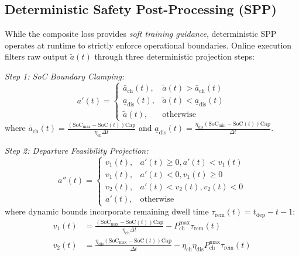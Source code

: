 \documentclass[journal]{IEEEtran}
\theoremstyle{remark}
\begin{document}
\subsection{Deterministic Safety Post-Processing (SPP)}
While the composite loss provides \textit{soft training guidance}, deterministic SPP operates at runtime to strictly enforce operational boundaries. Online execution filters raw output $\tilde{a}(t)$ through three deterministic projection steps:

\textit{Step 1: SoC Boundary Clamping:}
\begin{equation}
a'(t) = \begin{cases}
\bar{a}_{\mathrm{ch}}(t), & \tilde{a}(t) > \bar{a}_{\mathrm{ch}}(t) \\
\underline{a}_{\mathrm{dis}}(t), & \tilde{a}(t) < \underline{a}_{\mathrm{dis}}(t) \\
\tilde{a}(t), & \text{otherwise}
\end{cases}
\label{eq:spp_step1}
\end{equation}
where $\bar{a}_{\mathrm{ch}}(t) = \frac{(\mathrm{SoC}_{\max} - \mathrm{SoC}(t))\mathrm{Cap}}{\eta_{\mathrm{ch}}\Delta t}$ and $\underline{a}_{\mathrm{dis}}(t) = \frac{\eta_{\mathrm{dis}}(\mathrm{SoC}_{\min} - \mathrm{SoC}(t))\mathrm{Cap}}{\Delta t}$.

\textit{Step 2: Departure Feasibility Projection:}
\begin{equation}
a''(t) = \begin{cases}
v_1(t), & a'(t) \ge 0, a'(t) < v_1(t) \\
v_1(t), & a'(t) < 0, v_1(t) \ge 0 \\
v_2(t), & a'(t) < v_2(t), v_2(t) < 0 \\
a'(t), & \text{otherwise}
\end{cases}
\label{eq:spp_step2}
\end{equation}
where dynamic bounds incorporate remaining dwell time $\tau_{\mathrm{rem}}(t) = t_{\mathrm{dep}} - t - 1$:
\begin{align}
v_1(t) &= \frac{(\mathrm{SoC}_{\max} - \mathrm{SoC}(t))\mathrm{Cap}}{\eta_{\mathrm{ch}}\Delta t} - P_{\mathrm{ch}}^{\max} \tau_{\mathrm{rem}}(t) \label{eq:v1_bound}\\
v_2(t) &= \frac{\eta_{\mathrm{dis}}(\mathrm{SoC}_{\max} - \mathrm{SoC}(t))\mathrm{Cap}}{\Delta t} - \eta_{\mathrm{ch}}\eta_{\mathrm{dis}} P_{\mathrm{ch}}^{\max} \tau_{\mathrm{rem}}(t) \label{eq:v2_bound}
\end{align}
\end{document}
